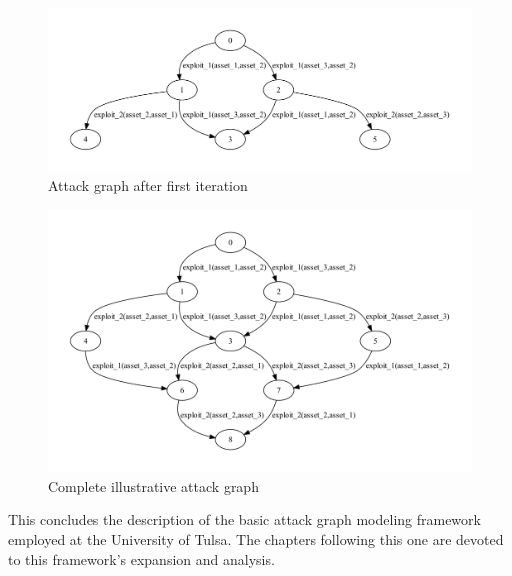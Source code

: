 \begin{figure}
\centering
\includegraphics[width=\textwidth]{ag_illustrative_simple/ag_depth2}
\caption{Attack graph after first iteration}
\label{fig:ill_ag_depth2}
\end{figure}

\begin{figure}
\centering
\includegraphics[width=\textwidth]{ag_illustrative_simple/ag_depth5}
\caption{Complete illustrative attack graph}
\label{fig:ill_ag_depth5}
\end{figure}

This concludes the description of the basic attack graph modeling framework 
employed at 
the University of Tulsa. The chapters following this one are devoted to
this framework's expansion and analysis.